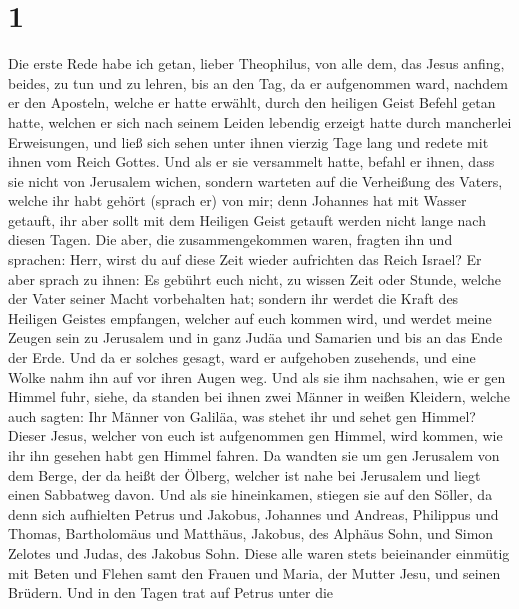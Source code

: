 \hypertarget{section}{%
\section{1}\label{section}}

 Die erste Rede habe ich getan, lieber Theophilus, von
alle dem, das Jesus anfing, beides, zu tun und zu lehren, 
bis an den Tag, da er aufgenommen ward, nachdem er den Aposteln, welche
er hatte erwählt, durch den heiligen Geist Befehl getan hatte,
 welchen er sich nach seinem Leiden lebendig erzeigt hatte
durch mancherlei Erweisungen, und ließ sich sehen unter ihnen vierzig
Tage lang und redete mit ihnen vom Reich Gottes.  Und als
er sie versammelt hatte, befahl er ihnen, dass sie nicht von Jerusalem
wichen, sondern warteten auf die Verheißung des Vaters, welche ihr habt
gehört (sprach er) von mir;  denn Johannes hat mit Wasser
getauft, ihr aber sollt mit dem Heiligen Geist getauft werden nicht
lange nach diesen Tagen.  Die aber, die zusammengekommen
waren, fragten ihn und sprachen: Herr, wirst du auf diese Zeit wieder
aufrichten das Reich Israel?  Er aber sprach zu ihnen: Es
gebührt euch nicht, zu wissen Zeit oder Stunde, welche der Vater seiner
Macht vorbehalten hat;  sondern ihr werdet die Kraft des
Heiligen Geistes empfangen, welcher auf euch kommen wird, und werdet
meine Zeugen sein zu Jerusalem und in ganz Judäa und Samarien und bis an
das Ende der Erde.  Und da er solches gesagt, ward er
aufgehoben zusehends, und eine Wolke nahm ihn auf vor ihren Augen weg.
 Und als sie ihm nachsahen, wie er gen Himmel fuhr,
siehe, da standen bei ihnen zwei Männer in weißen Kleidern,
 welche auch sagten: Ihr Männer von Galiläa, was stehet
ihr und sehet gen Himmel? Dieser Jesus, welcher von euch ist aufgenommen
gen Himmel, wird kommen, wie ihr ihn gesehen habt gen Himmel fahren.
 Da wandten sie um gen Jerusalem von dem Berge, der da
heißt der Ölberg, welcher ist nahe bei Jerusalem und liegt einen
Sabbatweg davon.  Und als sie hineinkamen, stiegen sie
auf den Söller, da denn sich aufhielten Petrus und Jakobus, Johannes und
Andreas, Philippus und Thomas, Bartholomäus und Matthäus, Jakobus, des
Alphäus Sohn, und Simon Zelotes und Judas, des Jakobus Sohn.
 Diese alle waren stets beieinander einmütig mit Beten
und Flehen samt den Frauen und Maria, der Mutter Jesu, und seinen
Brüdern.  Und in den Tagen trat auf Petrus unter die
